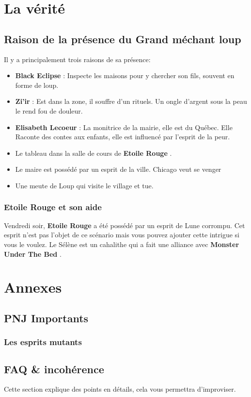 \documentclass[oneside,12pt]{book}
\newcommand{\Lynn}{\textbf{Etoile Rouge} }
\newcommand{\Monster}{\textbf{Monster Under The Bed} }
\newcommand{\BlackEclipse}{\textbf{Black Eclipse} }
\newcommand{\Elisabeth}{\textbf{Elisabeth Lecoeur} }
\newcommand{\Thomas}{\textbf{Zi'ir} }
\begin{document}
\begin{flushleft}
\chapter{La vérité}


\section{Raison de la présence du Grand méchant loup}
Il y a principalement trois raisons de sa présence: 
\begin{itemize}
\item \BlackEclipse : Inspecte les maisons pour y chercher son fils, souvent en forme de loup. 
\item \Thomas : Est dans la zone, il souffre d'un rituels. Un ongle d'argent sous la peau le rend fou de douleur.
\item \Elisabeth : La monitrice de la mairie, elle est du Québec. Elle Raconte des contes aux enfants, elle est influencé par l'esprit de la peur.
\item Le tableau dans la salle de cours de \Lynn. 
\item Le maire est possédé par un esprit de la ville. Chicago veut se venger
\item Une meute de Loup qui visite le village et tue.
\end{itemize}

\subsection{\Lynn et son aide}
Vendredi soir, \Lynn a été possédé par un esprit de Lune corrompu. Cet esprit n'est pas l'objet de ce scénario mais vous pouvez ajouter cette intrigue si vous le voulez. Le Sélène est un cahalithe qui a fait une alliance avec \Monster .


\chapter{Annexes}
\section{PNJ Importants}
\subsection{Les esprits mutants}
\label{esprit_mutant}


\clearpage

\section{FAQ \& incohérence}
Cette section explique des points en détails, cela vous permettra d'improviser.

\end{flushleft}
\end{document}
